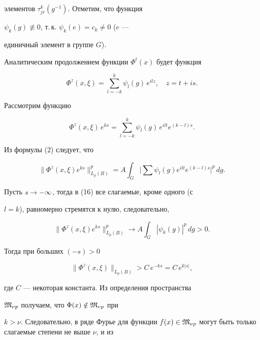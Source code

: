 \begin{pf}
элементов $\tau_{jr}^k(g^{-1})$. Отметим, что функция


$\psi_k(g)\not\equiv 0$, т.\,к. $\psi_k(e)=c_k\ne 0$ ($e$ ---


единичный элемент в группе $G$).





Аналитическим продолжением функции $\Phi^t(x)$ будет функция


$$


\Phi^z(x,\xi)=\sum_{l=-k}^k \psi_l(g)\,e^{ilz},\quad


z=t+is.


$$


Рассмотрим функцию


$$


\Phi^z(x,\xi)\,e^{ks}


=\sum_{l=-k}^k \psi_l(g)\,e^{ilt}e^{(k-l)s}.


$$


Из формулы (2) следует, что


\begin{equation}


\|\Phi^z(x,\xi)e^{ks}\|_{L_p(B)}^p=A\int_G\Big|\sum \psi_l(g)


e^{ilt}e^{(k-l)s}\Big|^p\,dg.


\end{equation}





Пусть $s\to -\infty$, тогда в (16) все слагаемые, кроме одного (с


$l=k$), равномерно стремятся к нулю, следовательно,


$$


\|\Phi^z(x,\xi)e^{ks}\|^p_{L_p(B)}\to A\int_G |\psi_k(g)|^p


\, dg>0.


$$


Тогда при больших $(-s)>0$


$$


\|\Phi^z(x,\xi)\|_{L_p(B)}>C\,e^{-ks}=C\,e^{k|s|},


$$


где $C$ --- некоторая константа. Из определения пространства


$\frak M_{\nu p}$ получаем, что $\Phi(x)\notin\frak M_{\nu p}$ при


$k>\nu$. Следовательно, в ряде Фурье для функции $f(x)\in\Mg_{\nu


p}$ могут быть только слагаемые степени не выше $\nu$, и из



\end{pf}
